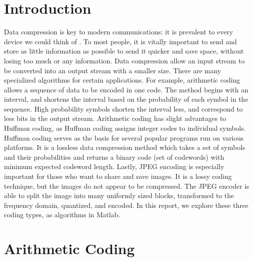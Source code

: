 \documentclass[11pt,a4paper,table]{article}
\begin{document}
\setcounter{page}{2}

\section{Introduction}
Data compression is key to modern communications: it is prevalent to every device we could think of \cite{Salomon2007}. To most people, it is vitally important to send and store as little information as possible to send it quicker and save space, without losing too much or any information. Data compression allow an input stream to be converted into an output stream with a smaller size. There are many specialized algorithms for certain applications. For example, arithmetic coding allows a sequence of data to be encoded in one code. The method begins with an interval, and shortens the interval based on the probability of each symbol in the sequence. High probability symbols shorten the interval less, and correspond to less bits in the output stream. Arithmetic coding has slight advantages to Huffman coding, as Huffman coding assigns integer codes to individual symbols. Huffman coding serves as the basis for several popular programs run on various platforms. It is a lossless data compression method which takes a set of symbols and their probabilities and returns a binary code (set of codewords) with minimum expected codeword length. Lastly, JPEG encoding is especially important for those who want to share and save images. It is a lossy coding technique, but the images do not appear to be compressed. The JPEG encoder is able to split the image into many uniformly sized blocks, transformed to the frequency domain, quantized, and encoded. In this report, we explore these three coding types, as algorithms in Matlab.

\section{Arithmetic Coding}
\end{document}
